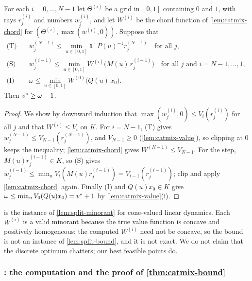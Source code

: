 \begin{lemma}\label{lem:catmix-dp}
For each $i = 0, \dots, N-1$ let $\Theta^{(i)}$ be a grid in $[0,1]$ containing $0$ and $1$, with rays $r^{(i)}_j$ and numbers $w^{(i)}_j$, and let $W^{(i)}$ be the chord function of \cref{lem:catmix-chord} for $(\Theta^{(i)}, \max(w^{(i)}, 0))$.
Suppose that
\begin{align*}
\text{(T)}\quad & w^{(N-1)}_j \le \min_{u\in[0,1]} \mathbb{1}^\top P(u)^{-1} r^{(N-1)}_j \quad\text{for all } j,\\
\text{(S)}\quad & w^{(i-1)}_j \le \min_{u\in[0,1]} W^{(i)}\bigl(M(u)\,r^{(i-1)}_j\bigr) \quad\text{for all } j \text{ and } i = N-1, \dots, 1,\\
\text{(I)}\quad & \omega \le \min_{u\in[0,1]} W^{(0)}\bigl(Q(u)\,x_0\bigr).
\end{align*}
Then $v^{*} \ge \omega - 1$.
\end{lemma}

\begin{proof}
We show by downward induction that $\max(w^{(i)}_j, 0) \le V_i(r^{(i)}_j)$ for all $j$ and that $W^{(i)} \le V_i$ on $K$.
For $i = N-1$, (T) gives $w^{(N-1)}_j \le V_{N-1}(r^{(N-1)}_j)$, and $V_{N-1} \ge 0$ (\cref{lem:catmix-value}), so clipping at $0$ keeps the inequality; \cref{lem:catmix-chord} gives $W^{(N-1)} \le V_{N-1}$.
For the step, $M(u)r^{(i-1)}_j \in K$, so (S) gives $w^{(i-1)}_j \le \min_u V_i(M(u)r^{(i-1)}_j) = V_{i-1}(r^{(i-1)}_j)$; clip and apply \cref{lem:catmix-chord} again.
Finally (I) and $Q(u)x_0 \in K$ give $\omega \le \min_u V_0(Q(u)x_0) = v^{*} + 1$ by \cref{lem:catmix-value}(i).
\end{proof}

 is the instance of \cref{lem:split-minorant} for cone-valued linear dynamics.
Each $W^{(i)}$ is a valid minorant because the true value function is concave and positively homogeneous; the computed $W^{(i)}$ need not be concave, so the bound is not an instance of \cref{lem:split-bound}, and it is not exact.
We do not claim that the discrete optimum chatters; our best feasible points do.

\subsubsection{\texorpdfstring{}{catmix}: the computation and the proof of \texorpdfstring{\cref{thm:catmix-bound}}{the theorem}}\label{app:catmix-computation}

